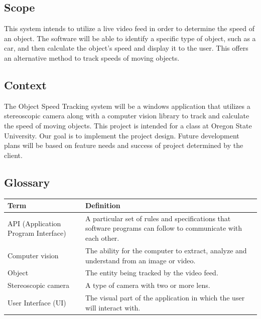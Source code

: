 \documentclass[letterpaper,10pt,onecolumn,draftclsnofoot]{IEEEtran}
\begin{document}
\subsection{Scope}
This system intends to utilize a live video feed in order to determine the speed of an object.
The software will be able to identify a specific type of object, such as a car, and then calculate the object's speed and display it to the user.
This offers an alternative method to track speeds of moving objects.


\subsection{Context}
The Object Speed Tracking system will be a windows application that utilizes a stereoscopic camera along with a computer vision library to track and calculate the speed of moving objects.
This project is intended for a class at Oregon State University. Our goal is to implement the project design.
Future development plans will be based on feature needs and success of project determined by the client.


\subsection{Glossary}
\begin{center}
	\begin{tabular}{|p{4cm}|p{12cm}|}
    
		\hline
		\textbf{Term} & \textbf{Definition} \\
		\hline
		API (Application Program Interface) & A particular set of rules and specifications that software programs can follow to communicate with each other. \\
		\hline
		Computer vision & The ability for the computer to extract, analyze and understand from an image or video. \\
		\hline
		Object & The entity being tracked by the video feed.  \\
		\hline
		Stereoscopic camera & A type of camera with two or more lens.  \\
		\hline
    	User Interface (UI) & The visual part of the application in which the user will interact with.  \\
		\hline
	
	\end{tabular}
\end{center}
\end{document}
